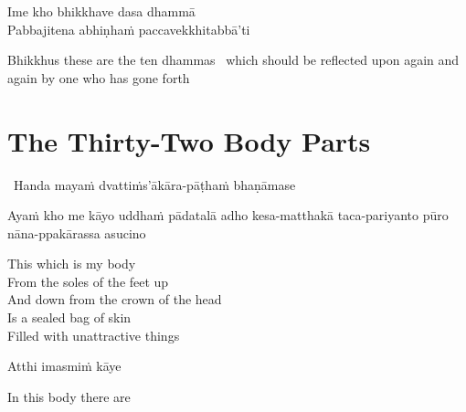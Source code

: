 Ime kho bhikkhave dasa dhammā\\
Pabbajitena abhiṇhaṁ paccavekkhitabbā'ti

\ifninebythirteen\vspace{-0.2em}\fi

\begin{english-hang-verses}
  Bhikkhus these are the ten dhammas \breathmark\ which should be reflected upon again and again by one who has gone forth
\end{english-hang-verses}

\ifninebythirteen\vspace{-0.35em}\fi

\suttaRef{[AN 10.48]}

\ifdigital{}\fi



\ifafive
{}
\fi

\section{The Thirty-Two Body Parts}
\label{32-parts}

\begin{leader}
  \anglebracketleft\ \hspace{-0.5mm}Handa mayaṁ dvattiṁs'ākāra-pāṭhaṁ bhaṇāmase \hspace{-0.5mm}\anglebracketright\
\end{leader}

\begin{pali-hang}
  Ayaṁ kho me kāyo uddhaṁ pādatalā adho kesa-matthakā taca-pariyanto pūro nāna-ppakārassa asucino
\end{pali-hang}

\begin{english-verses}
  This which is my body\\
  From the soles of the feet up\\
  And down from the crown of the head\\
  Is a sealed bag of skin\\
  Filled with unattractive things
\end{english-verses}

Atthi imasmiṁ kāye

\begin{english}
  In this body there are
\end{english}

\ifafive

